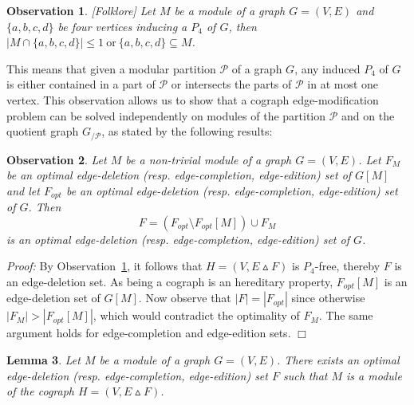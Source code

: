 \documentclass[11pt]{article}
\newenvironment{proof}{\noindent\textit{Proof: }}{{\hfill $\Box$}}
\newtheorem{lemma}{Lemma}[section]
\newtheorem{observation}[lemma]{Observation}
\begin{document}
\begin{observation}\label{obs:p4} [Folklore]
Let $M$ be a module of a graph $G=(V,E)$ and $\{a,b,c,d\}$ be four vertices inducing a $P_4$ of $G$, then $|M\cap\{a,b,c,d\}|\leqslant 1~\mbox{or}~\{a,b,c,d\}\subseteq M$.
\end{observation}

This means that given a modular partition $\mathcal{P}$ of a graph $G$, any induced $P_4$ of $G$ is either contained in a part of $\mathcal{P}$ or intersects the parts of $\mathcal{P}$ in at most one vertex. This observation allows us to show that a cograph edge-modification problem can be solved independently on modules of the partition $\mathcal{P}$ and on the quotient graph $G_{/\mathcal{P}}$, as stated by the following results:

\begin{observation} \label{obs:module}
Let $M$ be a non-trivial module of a graph $G=(V,E)$. Let $F_M$ be an optimal edge-deletion (resp. edge-completion, edge-edition) set of $G[M]$ and  let $F_{opt}$ be an optimal edge-deletion (resp. edge-completion, edge-edition) set of $G$. Then 
$$F=(F_{opt}\setminus F_{opt}[M])\cup F_M$$
is an optimal edge-deletion (resp. edge-completion, edge-edition) set of $G$.
\end{observation}

\begin{proof}
By Observation~\ref{obs:p4}, it follows that $H=(V,E\vartriangle F)$ is $P_4$-free, thereby $F$ is an edge-deletion set. 
As being a cograph is an hereditary property, $F_{opt}[M]$ is an edge-deletion set of $G[M]$. Now observe that $|F| = |F_{opt}|$  since otherwise $|F_M|>|F_{opt}[M]|$, which would contradict the optimality of $F_M$. The same argument holds for edge-completion and edge-edition sets.
 \end{proof}

\begin{lemma} \label{lem:one-module}
Let $M$  be a module of a graph $G=(V,E)$. There exists an optimal edge-deletion (resp. edge-completion, edge-edition) set $F$ such that $M$ is a module of the cograph $H=(V,E\vartriangle F)$.
\end{lemma}
\end{document}
